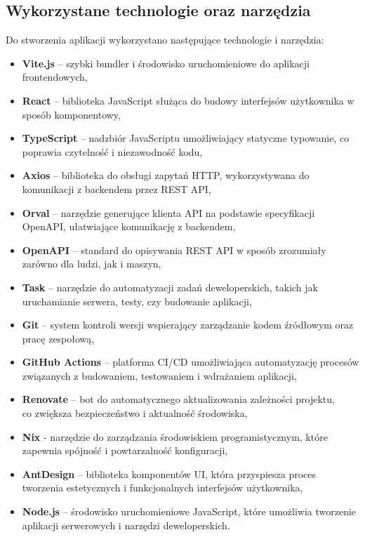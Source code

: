 \documentclass[../../spr.tex]{subfiles}
\begin{document}
\subsection{Wykorzystane technologie oraz narzędzia}
Do stworzenia aplikacji wykorzystano następujące technologie i narzędzia:
\begin{itemize}
    \item \textbf{Vite.js} – szybki bundler i środowisko uruchomieniowe do 
    aplikacji frontendowych,
    \item \textbf{React} – biblioteka JavaScript służąca do budowy
    interfejsów użytkownika w sposób komponentowy,
    \item \textbf{TypeScript} – nadzbiór JavaScriptu umożliwiający statyczne typowanie,
    co poprawia czytelność i niezawodność kodu,
    \item \textbf{Axios} – biblioteka do obsługi zapytań HTTP,
    wykorzystywana do komunikacji z backendem przez REST API,
    \item \textbf{Orval} – narzędzie generujące klienta API na podstawie specyfikacji OpenAPI,
    ułatwiające komunikację z backendem,
    \item \textbf{OpenAPI} – standard do opisywania REST API w sposób zrozumiały zarówno dla ludzi,
    jak i maszyn,
    \item \textbf{Task} – narzędzie do automatyzacji zadań deweloperskich,
    takich jak uruchamianie serwera, testy, czy budowanie aplikacji,
    \item \textbf{Git} – system kontroli wersji wspierający zarządzanie kodem
    źródłowym oraz pracę zespołową,
    \item \textbf{GitHub Actions} – platforma CI/CD umożliwiająca automatyzację
    procesów związanych z budowaniem, testowaniem i wdrażaniem aplikacji,
    \item \textbf{Renovate} – bot do automatycznego aktualizowania zależności projektu,\\
    co zwiększa bezpieczeństwo i aktualność środowiska,
    \item \textbf{Nix} - narzędzie do zarządzania środowiskiem programistycznym,
    które zapewnia spójność i powtarzalność konfiguracji,
    \item \textbf{AntDesign} – biblioteka komponentów UI,
    która przyspiesza proces tworzenia estetycznych i funkcjonalnych interfejsów użytkownika,
    \item \textbf{Node.js} – środowisko uruchomieniowe JavaScript,
    które umożliwia tworzenie aplikacji serwerowych i narzędzi deweloperskich.
\end{itemize}
\end{document}
